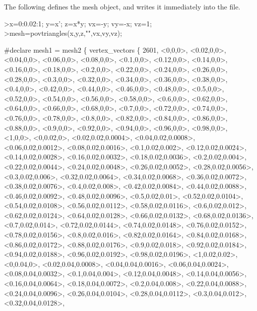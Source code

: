 \documentclass[a4paper,10pt]{article}
\begin{document}
\begin{eulernotebook}
\begin{eulercomment}
The following defines the mesh object, and writes it immediately into the file.
\end{eulercomment}
\begin{eulerprompt}
>x=0:0.02:1; y=x'; z=x*y; vx=-y; vy=-x; vz=1;
>mesh=povtriangles(x,y,z,"",vx,vy,vz);
\end{eulerprompt}
\begin{euleroutput}
  #declare mesh1 =
  mesh2 \{
  vertex_vectors \{ 2601,
  <0,0,0>,
  <0.02,0,0>,
  <0.04,0,0>,
  <0.06,0,0>,
  <0.08,0,0>,
  <0.1,0,0>,
  <0.12,0,0>,
  <0.14,0,0>,
  <0.16,0,0>,
  <0.18,0,0>,
  <0.2,0,0>,
  <0.22,0,0>,
  <0.24,0,0>,
  <0.26,0,0>,
  <0.28,0,0>,
  <0.3,0,0>,
  <0.32,0,0>,
  <0.34,0,0>,
  <0.36,0,0>,
  <0.38,0,0>,
  <0.4,0,0>,
  <0.42,0,0>,
  <0.44,0,0>,
  <0.46,0,0>,
  <0.48,0,0>,
  <0.5,0,0>,
  <0.52,0,0>,
  <0.54,0,0>,
  <0.56,0,0>,
  <0.58,0,0>,
  <0.6,0,0>,
  <0.62,0,0>,
  <0.64,0,0>,
  <0.66,0,0>,
  <0.68,0,0>,
  <0.7,0,0>,
  <0.72,0,0>,
  <0.74,0,0>,
  <0.76,0,0>,
  <0.78,0,0>,
  <0.8,0,0>,
  <0.82,0,0>,
  <0.84,0,0>,
  <0.86,0,0>,
  <0.88,0,0>,
  <0.9,0,0>,
  <0.92,0,0>,
  <0.94,0,0>,
  <0.96,0,0>,
  <0.98,0,0>,
  <1,0,0>,
  <0,0.02,0>,
  <0.02,0.02,0.0004>,
  <0.04,0.02,0.0008>,
  <0.06,0.02,0.0012>,
  <0.08,0.02,0.0016>,
  <0.1,0.02,0.002>,
  <0.12,0.02,0.0024>,
  <0.14,0.02,0.0028>,
  <0.16,0.02,0.0032>,
  <0.18,0.02,0.0036>,
  <0.2,0.02,0.004>,
  <0.22,0.02,0.0044>,
  <0.24,0.02,0.0048>,
  <0.26,0.02,0.0052>,
  <0.28,0.02,0.0056>,
  <0.3,0.02,0.006>,
  <0.32,0.02,0.0064>,
  <0.34,0.02,0.0068>,
  <0.36,0.02,0.0072>,
  <0.38,0.02,0.0076>,
  <0.4,0.02,0.008>,
  <0.42,0.02,0.0084>,
  <0.44,0.02,0.0088>,
  <0.46,0.02,0.0092>,
  <0.48,0.02,0.0096>,
  <0.5,0.02,0.01>,
  <0.52,0.02,0.0104>,
  <0.54,0.02,0.0108>,
  <0.56,0.02,0.0112>,
  <0.58,0.02,0.0116>,
  <0.6,0.02,0.012>,
  <0.62,0.02,0.0124>,
  <0.64,0.02,0.0128>,
  <0.66,0.02,0.0132>,
  <0.68,0.02,0.0136>,
  <0.7,0.02,0.014>,
  <0.72,0.02,0.0144>,
  <0.74,0.02,0.0148>,
  <0.76,0.02,0.0152>,
  <0.78,0.02,0.0156>,
  <0.8,0.02,0.016>,
  <0.82,0.02,0.0164>,
  <0.84,0.02,0.0168>,
  <0.86,0.02,0.0172>,
  <0.88,0.02,0.0176>,
  <0.9,0.02,0.018>,
  <0.92,0.02,0.0184>,
  <0.94,0.02,0.0188>,
  <0.96,0.02,0.0192>,
  <0.98,0.02,0.0196>,
  <1,0.02,0.02>,
  <0,0.04,0>,
  <0.02,0.04,0.0008>,
  <0.04,0.04,0.0016>,
  <0.06,0.04,0.0024>,
  <0.08,0.04,0.0032>,
  <0.1,0.04,0.004>,
  <0.12,0.04,0.0048>,
  <0.14,0.04,0.0056>,
  <0.16,0.04,0.0064>,
  <0.18,0.04,0.0072>,
  <0.2,0.04,0.008>,
  <0.22,0.04,0.0088>,
  <0.24,0.04,0.0096>,
  <0.26,0.04,0.0104>,
  <0.28,0.04,0.0112>,
  <0.3,0.04,0.012>,
  <0.32,0.04,0.0128>,

\end{euleroutput}
\end{eulernotebook}
\end{document}
